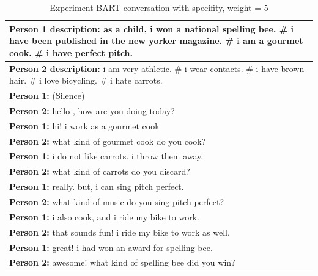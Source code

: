 \begin{table}[ht]
\centering
 \begin{tabular}{|p{14cm}|} 
 \hline\hline
 \textbf{Person 1 description:} as a child, i won a national spelling bee. \# i have been published in the new yorker magazine. \# i am a gourmet cook. \# i have perfect pitch. \\
 \hline
 \textbf{Person 2 description:} i am very athletic. \# i wear contacts. \# i have brown hair. \# i love bicycling. \# i hate carrots. \\
 \hline\hline
 \textbf{Person 1:} (Silence) \\
 \textbf{Person 2:} hello , how are you doing today? \\ 
 \textbf{Person 1:} hi! i work as a gourmet cook \\
 \textbf{Person 2:} what kind of gourmet cook do you cook?\\
 \textbf{Person 1:} i do not like carrots. i throw them away. \\
 \textbf{Person 2:} what kind of carrots do you discard? \\
 \textbf{Person 1:} really. but, i can sing pitch perfect. \\
 \textbf{Person 2:} what kind of music do you sing pitch perfect? \\
 \textbf{Person 1:} i also cook, and i ride my bike to work. \\
 \textbf{Person 2:} that sounds fun! i ride my bike to work as well. \\
 \textbf{Person 1:} great! i had won an award for spelling bee. \\
 \textbf{Person 2:} awesome! what kind of spelling bee did you win? \\
 \hline\hline
 \end{tabular}
 \caption{Experiment BART conversation with specifity, weight = 5}
\label{tab:bart_conversation_idf5}
\end{table}

